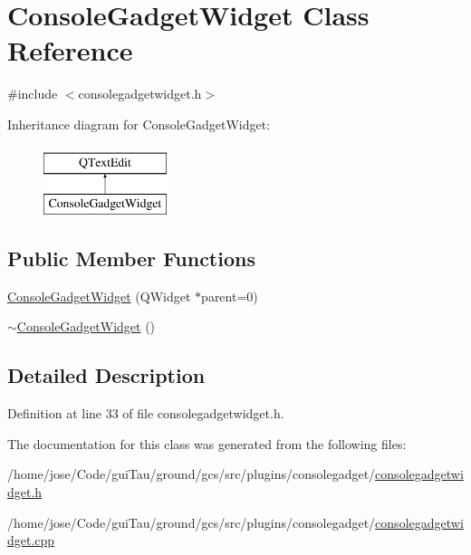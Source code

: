 \hypertarget{class_console_gadget_widget}{\section{Console\-Gadget\-Widget Class Reference}
\label{class_console_gadget_widget}
}


{\ttfamily \#include $<$consolegadgetwidget.\-h$>$}

Inheritance diagram for Console\-Gadget\-Widget\-:\begin{figure}[H]
\begin{center}
\leavevmode
\includegraphics[height=2.000000cm]{class_console_gadget_widget}
\end{center}
\end{figure}
\subsection*{Public Member Functions}
\begin{DoxyCompactItemize}
\item 
\hyperlink{group___console_plugin_gaf36f2dbb51922f2b8cea7297df751bde}{Console\-Gadget\-Widget} (Q\-Widget $\ast$parent=0)
\item 
\hyperlink{group___console_plugin_ga8f28b960cce5aee7f66b35e0fb38fd12}{$\sim$\-Console\-Gadget\-Widget} ()
\end{DoxyCompactItemize}


\subsection{Detailed Description}


Definition at line 33 of file consolegadgetwidget.\-h.



The documentation for this class was generated from the following files\-:\begin{DoxyCompactItemize}
\item 
/home/jose/\-Code/gui\-Tau/ground/gcs/src/plugins/consolegadget/\hyperlink{consolegadgetwidget_8h}{consolegadgetwidget.\-h}\item 
/home/jose/\-Code/gui\-Tau/ground/gcs/src/plugins/consolegadget/\hyperlink{consolegadgetwidget_8cpp}{consolegadgetwidget.\-cpp}\end{DoxyCompactItemize}

